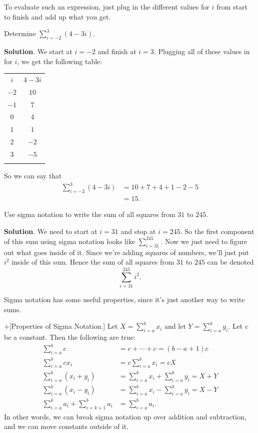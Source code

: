 \documentclass[10pt,]{book}
\theoremstyle{ptxplainnotitle}
\theoremstyle{ptxplaintitle}
\theoremstyle{ptxplainnotitle}
\theoremstyle{ptxplaintitle}
\theoremstyle{ptxplainnotitle}
\theoremstyle{ptxplaintitle}
\theoremstyle{ptxdefinitionnotitle}
\theoremstyle{ptxdefinitiontitle}
\theoremstyle{ptxdefinitionnotitle}
\theoremstyle{ptxdefinitiontitle}
\theoremstyle{ptxdefinitionnotitle}
\theoremstyle{ptxdefinitiontitle}
\theoremstyle{ptxdefinitionnotitle}
\theoremstyle{ptxdefinitiontitle}
\theoremstyle{ptxdefinitionnotitle}
\theoremstyle{ptxdefinitiontitle}
\numberwithin{equation}{section}
\newcommand{\hrulethin}  {\noalign{\hrule height 0.04em}}
\newcommand{\hrulethick} {\noalign{\hrule height 0.11em}}
\begin{document}
To evaluate such an expression, just plug in the different values for \(i\) from start to finish and add up what you get.%
\begin{example}\label{example-evaluating-a-sum}
\hypertarget{p-411}{}%
Determine \(\sum_{i=-2}^{3}(4-3i).\)%
\par\smallskip%
\noindent\textbf{Solution}.\hypertarget{solution-90}{}\quad%
\hypertarget{p-412}{}%
We start at \(i=-2\) and finish at \(i=3\). Plugging all of these values in for \(i\), we get the following table: \begin{table}
\centering
\begin{tabular}{cc}\hrulethick
\(i\)&\(4-3i\)\tabularnewline\hrulethin
\(-2\)&\(10\)\tabularnewline[0pt]
\(-1\)&\(7\)\tabularnewline[0pt]
\(0\)&\(4\)\tabularnewline[0pt]
\(1\)&\(1\)\tabularnewline[0pt]
\(2\)&\(-2\)\tabularnewline[0pt]
\(3\)&\(-5\)\tabularnewline\hrulethick
\end{tabular}
\end{table}
 So we can say that%
\begin{align*}
\sum_{i=-2}^{3}(4-3i) & =  10 + 7 + 4 + 1 - 2 - 5\\
& = 15. 
\end{align*}
%
\end{example}
\begin{example}\label{example-using-sigma-notation}
\hypertarget{p-413}{}%
Use sigma notation to write the sum of all squares from \(31\) to \(245\).%
\par\smallskip%
\noindent\textbf{Solution}.\hypertarget{solution-91}{}\quad%
\hypertarget{p-414}{}%
We need to start at \(i=31\) and stop at \(i=245\). So the first component of this sum using sigma notation looks like \(\sum_{i=31}^{245}\). Now we just need to figure out what goes inside of it. Since we're adding squares of numbers, we'll just put \(i^{2}\) inside of this sum. Hence the sum of all squares from \(31\) to \(245\) can be denoted%
\begin{equation*}
\sum_{i=31}^{245}i^{2}.
\end{equation*}
%
\end{example}
\hypertarget{p-415}{}%
Sigma notation has some useful properties, since it's just another way to write sums.%
\begin{theorem}+[{Properties of Sigma Notation.}]\label{theorem-properties-of-sigma-notation}
\hypertarget{p-416}{}%
Let \(X = \sum_{i=a}^{b}x_{i}\) and let \(Y = \sum_{i=a}^{b}y_{i}\). Let \(c\) be a constant. Then the following are true:%
\begin{align*}
\sum_{i=a}^{b}c & = c+\cdots+c = (b-a+1)c \\
\sum_{i=a}^{b}cx_{i} & = c\sum_{i=a}^{b}x_{i} = cX \\
\sum_{i=a}^{b}(x_{i}+y_{i}) & = \sum_{i=a}^{b}x_{i} + \sum_{i=a}^{b}y_{i} = X + Y \\
\sum_{i=a}^{b}(x_{i} - y_{i}) & = \sum_{i=a}^{b}x_{i} - \sum_{i=a}^{b}y_{i} = X - Y \\
\sum_{i=a}^{k}a_{i} + \sum_{i=k+1}^{b}a_{i} & = \sum_{i=a}^{b}a_{i}. 
\end{align*}
In other words, we can break sigma notation up over addition and subtraction, and we can move constants outside of it.%
\end{theorem}
\end{document}
